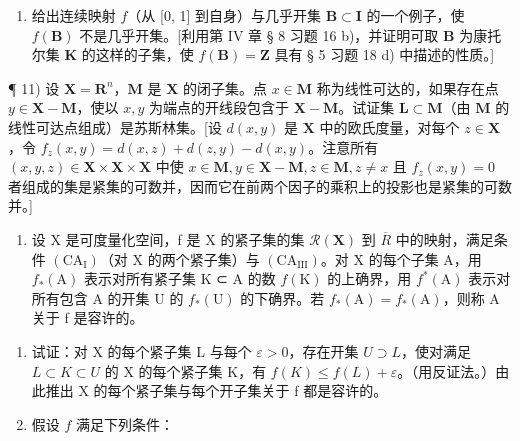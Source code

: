 \begin{enumerate}
\def\labelenumi{\alph{enumi})}
\setcounter{enumi}{1}
\tightlist
\item
  给出连续映射 \(f\)（从 {[}0, 1{]} 到自身）与几乎开集 \(\mathbf{B} \subset \mathbf{I}\) 的一个例子，使 \(f(\mathbf{B})\) 不是几乎开集。{[}利用第 IV 章 § 8 习题 16 b)，并证明可取 \(\mathbf{B}\) 为康托尔集 \(\mathbf{K}\) 的这样的子集，使 \(f(\mathbf{B}) = \mathbf{Z}\) 具有 § 5 习题 18 d) 中描述的性质。{]}
\end{enumerate}

¶ 11) 设 \(\mathbf{X} = \mathbf{R}^n\)，\(\mathbf{M}\) 是 \(\mathbf{X}\) 的闭子集。点 \(x \in \mathbf{M}\) 称为线性可达的，如果存在点 \(y \in \mathbf{X} - \mathbf{M}\)，使以 \(x, y\) 为端点的开线段包含于 \(\mathbf{X} - \mathbf{M}\)。试证集 \(\mathbf{L} \subset \mathbf{M}\)（由 \(\mathbf{M}\) 的线性可达点组成）是苏斯林集。{[}设 \(d(x, y)\) 是 \(\mathbf{X}\) 中的欧氏度量，对每个 \(z \in \mathbf{X}\)，令 \(f_z(x, y) = d(x, z) + d(z, y) - d(x, y)\)。注意所有 \((x, y, z) \in \mathbf{X} \times \mathbf{X} \times \mathbf{X}\) 中使 \(x \in \mathbf{M}, y \in \mathbf{X} - \mathbf{M}, z \in \mathbf{M}, z \neq x\) 且 \(f_z(x, y) = 0\) 者组成的集是紧集的可数并，因而它在前两个因子的乘积上的投影也是紧集的可数并。{]}

\begin{enumerate}
\def\labelenumi{\arabic{enumi})}
\setcounter{enumi}{11}
\tightlist
\item
  设 X 是可度量化空间，f 是 X 的紧子集的集 \(\mathcal{R}(\mathbf{X})\) 到 \(\overline{R}\) 中的映射，满足条件 \((\mathrm{CA}_{\mathrm{I}})\)（对 X 的两个紧子集）与 \((\mathrm{CA}_{\mathrm{III}})\)。对 X 的每个子集 A，用 \(f_{*}(\mathrm{A})\) 表示对所有紧子集 K ⊂ A 的数 \(f(\mathrm{K})\) 的上确界，用 \(f^{*}(\mathrm{A})\) 表示对所有包含 A 的开集 U 的 \(f_{*}(\mathrm{U})\) 的下确界。若 \(f_{*}(\mathrm{A}) = f_{*}(\mathrm{A})\)，则称 A 关于 f 是容许的。
\end{enumerate}

\begin{enumerate}
\def\labelenumi{\alph{enumi})}
\item
  试证：对 X 的每个紧子集 L 与每个 \(\varepsilon > 0\)，存在开集 \(U \supset L\)，使对满足 \(L \subset K \subset U\) 的 X 的每个紧子集 K，有 \(f(K) \leqslant f(L) + \varepsilon\)。（用反证法。）由此推出 X 的每个紧子集与每个开子集关于 f 都是容许的。
\item
  假设 \(f\) 满足下列条件：
\end{enumerate}


